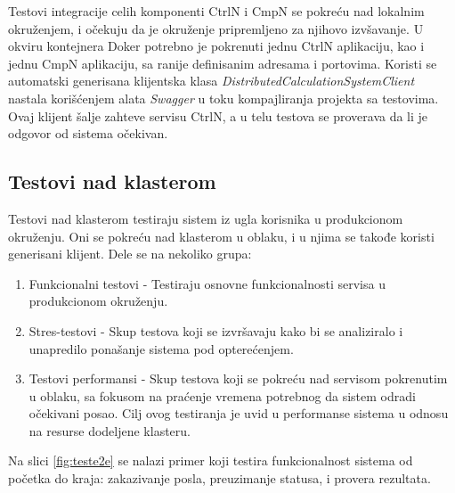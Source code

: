 \documentclass[12pt,oneside]{memoir}
\begin{document}
Testovi integracije celih komponenti CtrlN i CmpN se pokreću nad lokalnim okruženjem, i očekuju da je okruženje pripremljeno za njihovo izvšavanje. U okviru kontejnera Doker potrebno je pokrenuti jednu CtrlN aplikaciju, kao i jednu CmpN aplikaciju, sa ranije definisanim adresama i portovima. Koristi se automatski generisana klijentska klasa \emph{DistributedCalculationSystemClient} nastala korišćenjem alata \emph{Swagger} u toku kompajliranja projekta sa testovima. Ovaj klijent šalje zahteve servisu CtrlN, a u telu testova se proverava da li je odgovor od sistema očekivan.

\subsection{Testovi nad klasterom}

Testovi nad klasterom testiraju sistem iz ugla korisnika u produkcionom okruženju. Oni se pokreću nad klasterom u oblaku, i u njima se takođe koristi generisani klijent. Dele se na nekoliko grupa:
\begin{enumerate}
\item Funkcionalni testovi - Testiraju osnovne funkcionalnosti servisa u produkcionom okruženju.
\item Stres-testovi - Skup testova koji se izvršavaju kako bi se analiziralo i unapredilo ponašanje sistema pod opterećenjem. 
\item Testovi performansi - Skup testova koji se pokreću nad servisom pokrenutim u oblaku, sa fokusom na praćenje vremena potrebnog da sistem odradi očekivani posao. Cilj ovog testiranja je uvid u performanse sistema u odnosu na resurse dodeljene klasteru.
\end{enumerate}

Na slici \ref{fig:teste2e} se nalazi primer koji testira funkcionalnost sistema od početka do kraja: zakazivanje posla, preuzimanje statusa, i provera rezultata.
\end{document}
